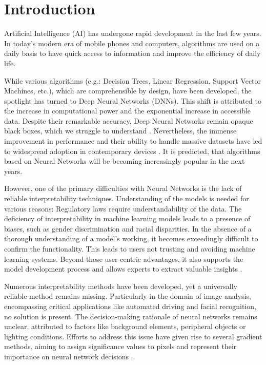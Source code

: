 
\chapter{Introduction}

Artificial Intelligence (AI) has undergone rapid development in the last few years. In today's modern era of mobile phones and computers, algorithms are used on a daily basis to have quick access to information and improve the efficiency of daily life.

While various algorithms (e.g.: Decision Trees, Linear Regression, Support Vector Machines, etc.), which are comprehensible by design, have been developed, the spotlight has turned to Deep Neural Networks (DNNs). This shift is attributed to the increase in computational power and the exponential increase in accessible data. Despite their remarkable accuracy, Deep Neural Networks remain opaque black boxes, which we struggle to understand \cite{Samek_2019}. Nevertheless, the immense improvement in performance and their ability to handle massive datasets have led to widespread adoption in contemporary devices \cite{zhang2022ai}. It is predicted, that algorithms based on Neural Networks will be becoming increasingly popular in the next years.

However, one of the primary difficulties with Neural Networks is the lack of reliable interpretability techniques. Understanding of the models is needed for various reasons: Regulatory laws require understandability of the data. The deficiency of interpretability in machine learning models leads to a presence of biases, such as gender discrimination and racial disparities. In the absence of a thorough understanding of a model's working, it becomes exceedingly difficult to confirm the functionality. This leads to users not trusting and avoiding machine learning systems. Beyond those user-centric advantages, it also supports the model development process and allows experts to extract valuable insights \cite{Samek_2019}.
 
Numerous interpretability methods have been developed, yet a universally reliable method remains missing. Particularly in the domain of image analysis, encompassing critical applications like automated driving and facial recognition, no solution is present. The decision-making rationale of neural networks remains unclear, attributed to factors like background elements, peripheral objects or lighting conditions. Efforts to address this issue have given rise to several gradient methods, aiming to assign significance values to pixels and represent their importance on neural network decisions \cite{Samek_2019}.

